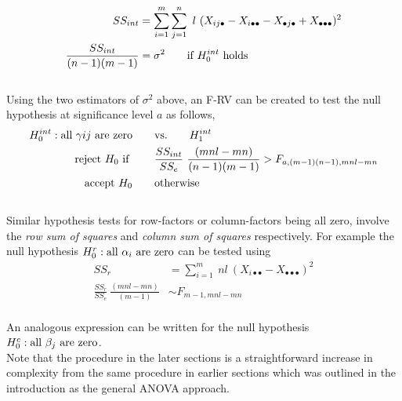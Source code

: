 \begin{align}
	SS_{int} &= \sum\limits_{i = 1}^{m} \sum\limits_{j = 1}^{n}\ l\ (X_{ij\bullet} - X_{i\bullet \bullet} - X_{\bullet j \bullet} + X_{\bullet \bullet \bullet})^2 \\
	\frac{SS_{int}}{(n-1)(m-1)} &= \sigma^2 \qquad \text{if $ H_0^{int} $ holds}
\end{align} \\

Using the two estimators of $ \sigma^2 $ above, an F-RV can be created to test the null hypothesis at significance level $ a $ as follows,\\

\begin{align}
	H_0^{int} : \text{all $ \gamma{ij} $ are zero} \qquad &\text{vs.} \qquad H_1^{int} \nonumber \\
	\text{reject $ H_0 $ if } \qquad & \frac{SS_{int}}{SS_e}\ \frac{(mnl - mn)}{(n-1)(m-1)} > F_{a,(m-1)(n-1), mnl-mn} \nonumber \\
	\text{accept $ H_0 $} \qquad & \text{otherwise}
\end{align}\\

Similar hypothesis tests for row-factors or column-factors being all zero, involve the \textit{row sum of squares} and \textit{column sum of squares} respectively. For example the null hypothesis $ H_0^r : \text{all $ \alpha_i $ are zero} $ can be tested using\\

\begin{align}
	SS_r &= \sum\limits_{i = 1}^{m} \ nl\ (X_{i\bullet \bullet} - X_{\bullet \bullet \bullet})^2 \\
	\frac{SS_{r}}{SS_e}\ \frac{(mnl - mn)}{(m-1)} &\sim F_{m-1, mnl-mn} 
\end{align}\\

An analogous expression can be written for the null hypothesis $ H_0^c : \text{all $ \beta_j $ are zero} $.\\

Note that the procedure in the later sections is a straightforward increase in complexity from the same procedure in earlier sections which was outlined in the introduction as the general ANOVA approach.